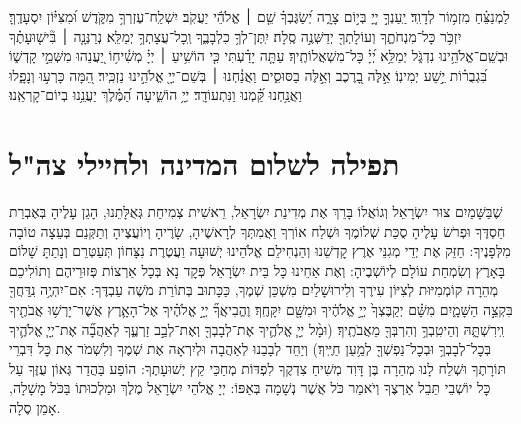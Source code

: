 \documentclass[a4paper, twoside, openany, parskip=half, 11pt]{article}
\begin{document}
\begin{multicols}{2}
לַמְנַצֵּ֗חַ מִזְמ֥וֹר לְדָוִֽד׃
 יַֽעַנְךָ֣ יְיָ֭ בְּי֣וֹם צָרָ֑ה יְ֝שַׂגֶּבְךָ֗ שֵׁ֤ם ׀ אֱלֹהֵ֬י יַעֲקֹֽב׃
 יִשְׁלַֽח־עֶזְרְךָ֥ מִקֹּ֑דֶשׁ וּ֝מִצִּיּ֗וֹן יִסְעָדֶֽךָּ׃
 יִזְכֹּ֥ר כָּל־מִנְחֹתֶ֑ךָ וְעוֹלָתְךָ֖ יְדַשְּׁנֶ֣ה סֶֽלָה׃
 יִֽתֶּן־לְךָ֥ כִלְבָבֶ֑ךָ וְֽכָל־עֲצָתְךָ֥ יְמַלֵּֽא׃
 נְרַנְּנָ֤ה ׀ בִּ֘ישׁ֤וּעָתֶ֗ךָ וּבְשֵֽׁם־אֱלֹהֵ֥ינוּ נִדְגֹּ֑ל יְמַלֵּ֥א יְ֝יָ֗ כָּל־מִשְׁאֲלוֹתֶֽיךָ׃
 עַתָּ֤ה יָדַ֗עְתִּי כִּ֤י הוֹשִׁ֥יעַ ׀ יְיָ֗ מְשִׁ֫יח֥וֹ יַ֭עֲנֵהוּ מִשְּׁמֵ֣י קָדְשׁ֑וֹ בִּ֝גְבֻר֗וֹת יֵ֣שַׁע יְמִינֽוֹ׃
 אֵ֣לֶּה בָ֭רֶכֶב וְאֵ֣לֶּה בַסּוּסִ֑ים וַאֲנַ֓חְנוּ ׀ בְּשֵׁם־יְיָ֖ אֱלֹהֵ֣ינוּ נַזְכִּֽיר׃
 הֵ֭מָּה כָּרְע֣וּ וְנָפָ֑לוּ וַאֲנַ֥חְנוּ קַּ֝֗מְנוּ וַנִּתְעוֹדָֽד׃
 יְיָ֥ הוֹשִׁ֑יעָה הַ֝מֶּ֗לֶךְ יַעֲנֵ֥נוּ בְיוֹם־קָרְאֵֽנוּ׃

\end{multicols}

\section*{תפילה לשלום המדינה ולחיילי צה"ל}

 שֶׁבַּשָּׁמַיִם צוּר יִשְׂרָאֵל וְגוֹאֲלוֹ בָּרֵךְ אֶת מְדִינַת יִשְׂרָאֵל, רֵאשִׁית צְמִיחַת גְּאֻלָּתֵנוּ, הָגֵן עָלֶיהָ בְּאֶבְרַת חַסְדֶּךָ וּפְרֹשׂ עָלֶיהָ סֻכַּת שְׁלוֹמֶךָ וּשְׁלַח אוֹרְךָ וַאֲמִתְּךָ לְרָאשֶׁיהָ, שָׂרֶיהָ וְיוֹעֲצֶיהָ וְתַקְּנֵם בְּעֵצָה טוֹבָה מִלְּפָנֶיךָ: חַזֵּק אֶת יְדֵי מְגִנֵּי אֶרֶץ קׇדְשֵׁנוּ וְהַנְחִילֵם אֱלֹהֵינוּ יְשׁוּעָה וַעֲטֶרֶת נִצָּחוֹן תְּעַטְּרֵם וְנָתַתָּ שָׁלוֹם בָּאָרֶץ וְשִׂמְחַת עוֹלָם לְיוֹשְׁבֶיהָ:
וְאֶת אַחֵינוּ כָּל בֵּית יִשְׂרָאֵל פְּקׇד נָא בְּכָל אַרְצוֹת פְּזוּרֵיהֶם וְתוֹלִיכֵם מְהֵרָה קוֹמְמִיּוּת לְצִיּוֹן עִירֶךָ וְלִירוּשָׁלַיִם מִשְׁכַּן שְׁמֶךָ, כַּכָּתוּב בְּתוֹרַת מֹשֶׁה עַבְדֶּךָ:
אִם־יִהְיֶ֥ה נִֽדַּחֲךָ֖ בִּקְצֵ֣ה הַשָּׁמָ֑יִם מִשָּׁ֗ם יְקַבֶּצְךָ֙ יְיָ֣ אֱלֹהֶ֔יךָ וּמִשָּׁ֖ם יִקָּחֶֽךָ׃
וֶהֱבִיאֲךָ֞ יְיָ֣ אֱלֹהֶ֗יךָ אֶל־הָאָ֛רֶץ אֲשֶׁר־יָרְשׁ֥וּ אֲבֹתֶ֖יךָ וִֽירִשְׁתָּ֑הּ וְהֵיטִֽבְךָ֥ וְהִרְבְּךָ֖ מֵאֲבֹתֶֽיךָ׃ 
(וּמָ֨ל יְיָ֧ אֱלֹהֶ֛יךָ אֶת־לְבָבְךָ֖ וְאֶת־לְבַ֣ב זַרְעֶ֑ךָ לְאַהֲבָ֞ה אֶת־יְיָ֧ אֱלֹהֶ֛יךָ בְּכׇל־לְבָבְךָ֥ וּבְכׇל־נַפְשְׁךָ֖ לְמַ֥עַן חַיֶּֽיךָ׃)
וְיַחֵד לְבָבֵנוּ לְאַהֲבָה וּלְיִרְאָה אֶת שְׁמֶךָ וְלִשְׁמֹר אֶת כׇּל דִּבְרֵי תּוֹרָתֶךָ וּשְׁלַח לָנוּ מְהֵרָה בֶּן דָּוִד מְשִׁיחַ צִדְקֶךָ לִפְדּוֹת מְחַכֵּי קֵץ יְשׁוּעָתֶךָ: הוֹפַע בַּהֲדַר גְּאוֹן עֻזֶּךָ עַל כׇּל יוֹשְׁבֵי תֵּבֵל אַרְצֶךָ וְיֹאמַר כֹּל אֲשֶׁר נְשָׁמָה בְּאַפּוֹ:
יְיָ אֱלֹהֵי יִשְׂרָאֵל מֶלֶךְ וּמַלְכוּתוֹ בַּכֹּל מָשָׁלָה, אָמֵן סֶלָה. 
\vspace{.25\baselineskip}
\end{document}
